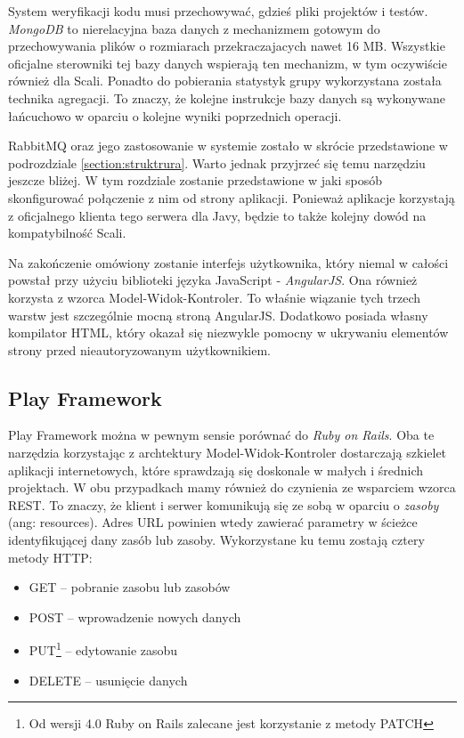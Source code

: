 \documentclass[brudnopis]{xmgr}
\begin{document}
System weryfikacji kodu musi przechowywać, gdzieś pliki projektów i testów. \emph{MongoDB} to nierelacyjna baza danych z mechanizmem gotowym do przechowywania plików o rozmiarach przekraczajacych nawet 16 MB. Wszystkie oficjalne sterowniki tej bazy danych wspierają ten mechanizm, w tym oczywiście również dla Scali. Ponadto do pobierania statystyk grupy wykorzystana została technika agregacji. To znaczy, że kolejne instrukcje bazy danych są wykonywane łańcuchowo w oparciu o kolejne wyniki poprzednich operacji.

RabbitMQ oraz jego zastosowanie w systemie zostało w skrócie przedstawione w podrozdziale \ref{section:struktrura}. Warto jednak przyjrzeć się temu narzędziu jeszcze bliżej. W tym rozdziale zostanie przedstawione w jaki sposób skonfigurować połączenie z nim od strony aplikacji. Ponieważ aplikacje korzystają z oficjalnego klienta tego serwera dla Javy, będzie to także kolejny dowód na kompatybilność Scali.

Na zakończenie omówiony zostanie interfejs użytkownika, który niemal w całości powstał przy użyciu biblioteki języka JavaScript - \emph{AngularJS}. Ona również korzysta z wzorca Model-Widok-Kontroler. To właśnie wiązanie tych trzech warstw jest szczególnie mocną stroną AngularJS. Dodatkowo posiada własny kompilator HTML, który okazał się niezwykle pomocny w ukrywaniu elementów strony przed nieautoryzowanym użytkownikiem.  

\subsection{Play Framework}

Play Framework można w pewnym sensie porównać do \emph{Ruby on Rails}. Oba te narzędzia korzystając z archtektury Model-Widok-Kontroler dostarczają szkielet aplikacji internetowych, które sprawdzają się doskonale w małych i średnich projektach. W obu przypadkach mamy również do czynienia ze wsparciem wzorca REST. To znaczy, że klient i serwer komunikują się ze sobą w oparciu o \emph{zasoby} (ang: resources). Adres URL powinien wtedy zawierać parametry w ścieżce identyfikującej dany zasób lub zasoby. Wykorzystane ku temu zostają cztery metody HTTP:

\begin{itemize}
\item GET -- pobranie zasobu lub zasobów
\item POST -- wprowadzenie nowych danych
\item PUT\footnote{Od wersji 4.0 Ruby on Rails zalecane jest korzystanie z metody PATCH} -- edytowanie zasobu
\item DELETE -- usunięcie danych
\end{itemize}
\end{document}
